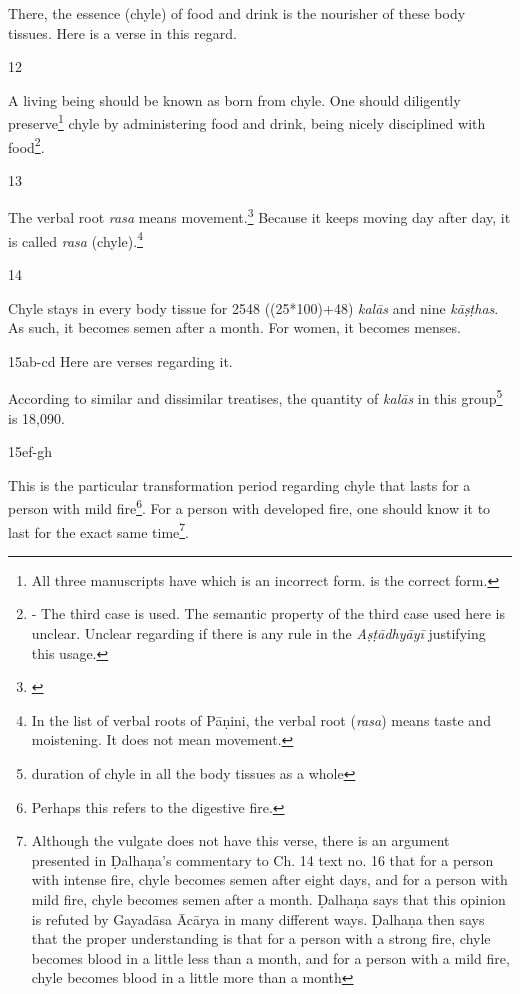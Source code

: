 \begin{translation}
There, the essence (chyle) of food and drink is the nourisher of these body tissues.
Here is a verse in this regard.

\item[12]

\begin{sloka}
A living being should be known as born from chyle. One should diligently preserve\footnote{All three manuscripts have  which is an incorrect form.  is the correct form.} chyle by administering food and drink, being nicely disciplined with food\footnote{ - The third case is used. The semantic property of the third case used here is unclear. Unclear regarding if there is any rule in the \emph{Aṣṭādhyāyī} justifying this usage.}.
\end{sloka}

\item[13]

The verbal root \emph{rasa} means movement.\footnote{\cite[109]{kunj-1907}} Because it keeps moving day after day, it is called \emph{rasa} (chyle).\footnote{In the list of verbal roots of Pāṇini, the verbal root (\emph{rasa}) means taste and moistening. It does not mean movement.}    

\item[14]

Chyle stays in every body tissue for 2548 ((25*100)+48) \emph{kalās} and nine \emph{kāṣṭhas}. As such, it becomes semen after a month. For women, it becomes menses.  

\item[15ab-cd] Here are verses regarding it.

\begin{sloka}
According to similar and dissimilar treatises, the quantity of \emph{kalās} in this group\footnote{duration of chyle in all the body tissues as a whole} is 18,090.
\end{sloka}

\item[15ef-gh]

\begin{sloka}
This is the particular transformation period regarding chyle that lasts for a person with mild fire\footnote{Perhaps this refers to the digestive fire.}. For a person with developed fire, one should know it to last for the exact same time\footnote{Although the vulgate does not have this verse, there is an argument presented in Ḍalhaṇa's commentary \citep[63]{vulgate} to Ch. 14 text no. 16 that for a person with intense fire, chyle becomes semen after eight days, and for a person with mild fire, chyle becomes semen after a month. Ḍalhaṇa says that this opinion is refuted by Gayadāsa Ācārya in many different ways. Ḍalhaṇa then says that the proper understanding is that for a person with a strong fire, chyle becomes blood in a little less than a month, and for a person with a mild fire, chyle becomes blood in a little more than a month}.


\end{sloka}
\end{translation}
